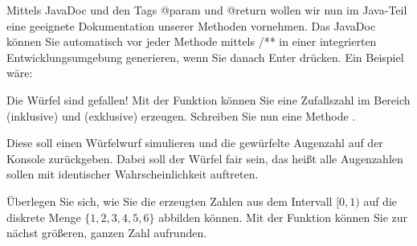 \documentclass{../tuda-exercise}
\begin{document}
  \maketitle

  \begin{note}[title=Dokumentation in Java:, color=tuda-red]
    Mittels JavaDoc und den Tags \textcolor{commentcolor}{@param} und
    \textcolor{commentcolor}{@return} wollen wir nun im Java-Teil eine geeignete Dokumentation
    unserer Methoden vornehmen. Das JavaDoc können Sie automatisch vor jeder Methode mittels
    \textcolor{commentcolor}{/**} in einer integrierten Entwicklungsumgebung generieren, wenn Sie
    danach Enter drücken. Ein Beispiel wäre:

    
  \end{note}

  \begin{task}[credit=\stars{1}{3}]{Die Würfel sind gefallen!}
    Mit der Funktion  können Sie eine Zufallszahl im Bereich
     (inklusive) und  (exklusive) erzeugen. Schreiben Sie nun eine
    Methode .

    \br

    Diese soll einen Würfelwurf simulieren und die gewürfelte Augenzahl auf der Konsole
    zurückgeben. Dabei soll der Würfel fair sein, das heißt alle Augenzahlen sollen mit
    identischer Wahrscheinlichkeit auftreten.

    \br

    \begin{note}[title=Hinweis, color=tuda-orange]
      Überlegen Sie sich, wie Sie die erzeugten Zahlen aus dem Intervall \([0,1)\) auf die
      diskrete Menge \(\{1, 2, 3, 4, 5, 6\}\) abbilden können. Mit der Funktion
       können Sie zur nächst größeren, ganzen Zahl aufrunden.
    \end{note}

    \clearpagesolution

    \begin{solution}
      
    \end{solution}
  \end{task}

  \clearpagenosolution
\end{document}
